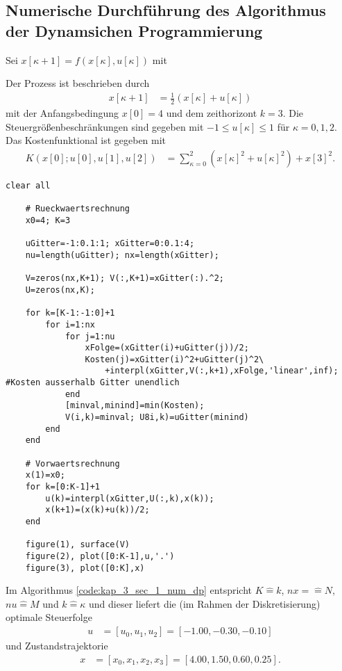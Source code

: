 \subsection{Numerische Durchführung des Algorithmus der Dynamsichen Programmierung}
Sei $x[\kappa+1] = f\left(x[\kappa],u[\kappa] \right)$ mit 
\begin{exmp}
Der Prozess ist beschrieben durch
\begin{align}
	x[\kappa + 1] & = \frac{1}{2}\left(x[\kappa]+u[\kappa] \right)
\end{align}
mit der Anfangsbedingung $x[0] = 4$ und dem zeithorizont $k=3$. Die Steuergrößenbeschränkungen sind gegeben mit $-1\leq u[\kappa]\leq 1$ für $\kappa =
0,1,2$. Das Kostenfunktional ist gegeben mit
\begin{align}
	K\left(x[0];u[0],u[1],u[2] \right) & = \sum\limits_{\kappa = 0}^2\left(x[\kappa]^2+u[\kappa]^2 \right) + x[3]^2.
\end{align}
\begin{lstlisting}[style=PythonStyle, caption=Numerische Algorithmus der Dynamischen Programmierung, label=code:kap_3_sec_1_num_dp] 
  	clear all
	
	# Rueckwaertsrechnung
	x0=4; K=3
	
	uGitter=-1:0.1:1; xGitter=0:0.1:4;
	nu=length(uGitter); nx=length(xGitter);
	
	V=zeros(nx,K+1); V(:,K+1)=xGitter(:).^2;
	U=zeros(nx,K);
	
	for k=[K-1:-1:0]+1
		for i=1:nx
			for j=1:nu
				xFolge=(xGitter(i)+uGitter(j))/2;
				Kosten(j)=xGitter(i)^2+uGitter(j)^2\
					+interpl(xGitter,V(:,k+1),xFolge,'linear',inf); #Kosten ausserhalb Gitter unendlich
			end
			[minval,minind]=min(Kosten);
			V(i,k)=minval; U8i,k)=uGitter(minind)
		end
	end
	
	# Vorwaertsrechnung
	x(1)=x0;
	for k=[0:K-1]+1
		u(k)=interpl(xGitter,U(:,k),x(k));
		x(k+1)=(x(k)+u(k))/2;
	end
	
	figure(1), surface(V)
	figure(2), plot([0:K-1],u,'.')
	figure(3), plot([0:K],x)
\end{lstlisting}  
Im Algorithmus \ref{code:kap_3_sec_1_num_dp} entspricht $K\hat{=}k$, $nx=\hat{=}N$, $nu\hat{=}M$ und $k\hat{=}\kappa$ und dieser liefert die (im
Rahmen der Diskretisierung) optimale Steuerfolge
\begin{align*}
	u & = \left[u_0, u_1, u_2\right] = \left[-1.00, -0.30, -0.10\right]
\end{align*}
und Zustandstrajektorie
\begin{align*}
	x & = \left[x_0,x_1,x_2,x_3 \right]=\left[4.00,1.50,0.60,0.25 \right].
\end{align*}
\end{exmp}
